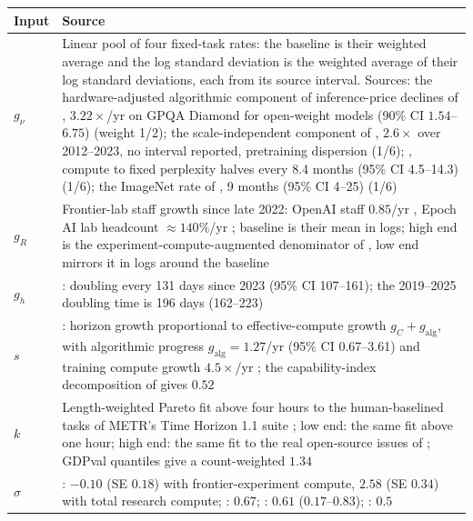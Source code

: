 \begin{tabular}{@{}lp{}@{}}
\toprule
Input & Source \\
\midrule
$g_\nu$ & Linear pool of four fixed-task rates: the baseline is their weighted average and the log standard deviation is the weighted average of their log standard deviations, each from its source interval. Sources: the hardware-adjusted algorithmic component of inference-price declines of \citet{gundlach2026price}, $3.22\times$/yr on GPQA Diamond for open-weight models (90\% CI $1.54$--$6.75$) (weight 1/2); the scale-independent component of \citet{gundlach2025origin}, $2.6\times$ over 2012--2023, no interval reported, pretraining dispersion (1/6); \citet{ho2024algorithmic}, compute to fixed perplexity halves every 8.4 months (95\% CI 4.5--14.3) (1/6); the ImageNet rate of \citet{erdil2022cv}, 9 months (95\% CI 4--25) (1/6) \\
$g_R$ & Frontier-lab staff growth since late 2022: OpenAI staff $0.85$/yr \citep{howhitfill2025experiments}, Epoch AI lab headcount $\approx140\%$/yr \citep{davidson2026networks}; baseline is their mean in logs; high end is the experiment-compute-augmented denominator of \citet{howhitfill2025experiments}, low end mirrors it in logs around the baseline \\
$g_h$ & \citet{metr2026th11}: doubling every 131 days since 2023 (95\% CI 107--161); the 2019--2025 doubling time is 196 days (162--223) \\
$s$ & \citet{whitfill2025horizon}: horizon growth proportional to effective-compute growth $g_C + g_{\mathrm{alg}}$, with algorithmic progress $g_{\mathrm{alg}} = 1.27$/yr (95\% CI 0.67--3.61) and training compute growth $4.5\times$/yr \citep{sevilla2024compute}; the capability-index decomposition of \citet{ho2025rosetta} gives $0.52$ \\
$k$ & Length-weighted Pareto fit above four hours to the human-baselined tasks of METR's Time Horizon 1.1 suite \citep{metr2026th11,rein2025hcast}; low end: the same fit above one hour; high end: the same fit to the real open-source issues of \citet{becker2025productivity}; GDPval quantiles \citep{openai2025gdpval} give a count-weighted $1.34$ \\
$\sigma$ & \citet{whitfillwu2025compute}: $-0.10$ (SE $0.18$) with frontier-experiment compute, $2.58$ (SE $0.34$) with total research compute; \citet{davidson2023compute}: $0.67$; \citet{erdil2025gate}: $0.61$ ($0.17$--$0.83$); \citet{korinek2024scenarios}: $0.5$ \\
\bottomrule
\end{tabular}
